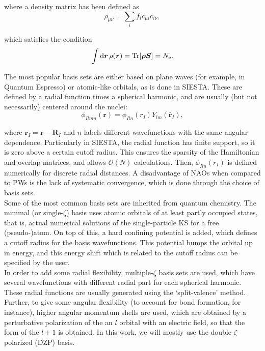 where a density matrix has been defined as
\begin{equation}
\label{densmat}
\rho_{\mu \nu}=\sum_{i}f_i c_{\mu i} c_{i \nu},
\end{equation}

which satisfies the condition
\begin{equation}
	\int \mathrm{d} \bm{r}\, \rho(\bm{r})=\operatorname{Tr}[\bm\rho \bm{S}]
=N_{\mathrm{e}}.
\end{equation}

The most popular basis sets are either based on plane waves (for example, in Quantum Espresso\parencite{Giannozzi2009}) or atomic-like orbitals, as is done in SIESTA. These are defined by a radial function times a spherical harmonic, and are usually (but not necessarily) centered around the nuclei\parencite{Soler2002}:
\begin{equation}
	\phi_{Ilmn}(\bm{r})=\phi_{Iln}\left(r_{I}\right)Y_{lm}\left(\hat{\bm{r}}_{I}\right),
\end{equation}

where \(\bm r_I=\bm r-\bm R_I\) and \(n\) labels different wavefunctions with the same angular dependence. Particularly in SIESTA, the radial function has finite support, so it is zero above a certain cutoff radius. This ensures the sparsity of the Hamiltonian and overlap matrices, and allows \(\mathcal{O}(N)\) calculations. Then, \(\phi_{Iln}\left(r_{I}\right)\) is defined numerically for discrete radial distances. A disadvantage of NAOs when compared to PWs is the lack of systematic convergence, which is done through the choice of basis sets.\\

Some of the most common basis sets are inherited from quantum chemistry. The minimal (or single-\(\zeta\)) basis uses atomic orbitals of at least partly occupied states, that is, actual numerical solutions of the single-particle KS for a free (pseudo-)atom. On top of this, a hard confining potential is added, which defines a cutoff radius for the basis wavefunctions. This potential bumps the orbital up in energy, and this energy shift which is related to the cutoff radius can be specified by the user.\\

In order to add some radial flexibility, multiple-\(\zeta\) basis sets are used, which have several wavefunctions with different radial part for each spherical harmonic. These radial functions are usually generated using the `split-valence' method\parencite{Huzinaga1984}. Further, to give some angular flexibility (to account for bond formation, for instance), higher angular momentum shells are used, which are obtained by a perturbative polarization of the an \(l\) orbital with an electric field, so that the form of the \(l+1\) is obtained\parencite{Soler2002}. In this work, we will mostly use the double-\(\zeta\) polarized (DZP) basis.


